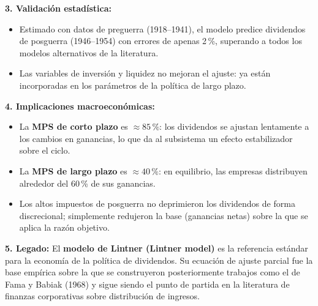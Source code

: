 \documentclass[12pt]{article}
\begin{document}
\noindent \textbf{3. Validaci\'on estad\'istica:}
\begin{itemize}
  \item Estimado con datos de preguerra (1918--1941), el modelo predice dividendos de
        posguerra (1946--1954) con errores de apenas 2\,\%, superando a todos los modelos
        alternativos de la literatura.
  \item Las variables de inversi\'on y liquidez no mejoran el ajuste: ya est\'an
        incorporadas en los par\'ametros de la pol\'itica de largo plazo.
\end{itemize}

\noindent \textbf{4. Implicaciones macroecon\'omicas:}
\begin{itemize}
  \item La \textbf{MPS de corto plazo} es $\approx 85\,\%$: los dividendos se ajustan lentamente
        a los cambios en ganancias, lo que da al subsistema un efecto estabilizador sobre el ciclo.
  \item La \textbf{MPS de largo plazo} es $\approx 40\,\%$: en equilibrio, las empresas
        distribuyen alrededor del 60\,\% de sus ganancias.
  \item Los altos impuestos de posguerra no deprimieron los dividendos de forma discrecional;
        simplemente redujeron la base (ganancias netas) sobre la que se aplica la raz\'on objetivo.
\end{itemize}

\noindent \textbf{5. Legado:}
El \textbf{modelo de Lintner (Lintner model)} es la referencia est\'andar para la econom\'ia
de la pol\'itica de dividendos. Su ecuaci\'on de ajuste parcial fue la base emp\'irica sobre
la que se construyeron posteriormente trabajos como el de Fama y Babiak (1968) y sigue siendo
el punto de partida en la literatura de finanzas corporativas sobre distribuci\'on de ingresos.
\end{document}

